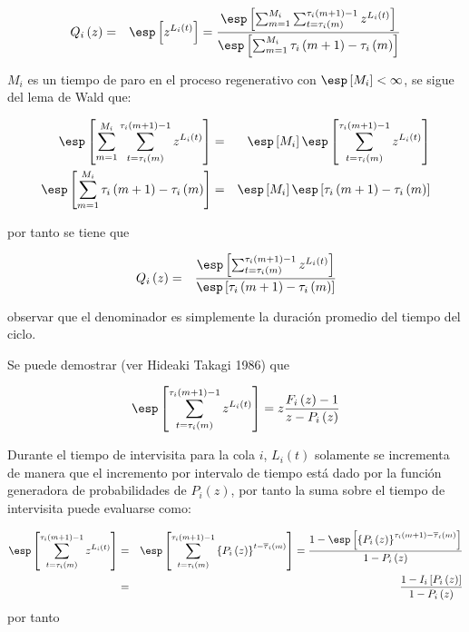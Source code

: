 \begin{eqnarray*}
Q_{i}\left(z\right)&=&\esp\left[z^{L_{i}\left(t\right)}\right]=\frac{\esp\left[\sum_{m=1}^{M_{i}}\sum_{t=\tau_{i}\left(m\right)}^{\tau_{i}\left(m+1\right)-1}z^{L_{i}\left(t\right)}\right]}{\esp\left[\sum_{m=1}^{M_{i}}\tau_{i}\left(m+1\right)-\tau_{i}\left(m\right)\right]}
\end{eqnarray*}

$M_{i}$ es un tiempo de paro en el proceso regenerativo con $\esp\left[M_{i}\right]<\infty$, se sigue del lema de Wald que:


\begin{eqnarray*}
\esp\left[\sum_{m=1}^{M_{i}}\sum_{t=\tau_{i}\left(m\right)}^{\tau_{i}\left(m+1\right)-1}z^{L_{i}\left(t\right)}\right]&=&\esp\left[M_{i}\right]\esp\left[\sum_{t=\tau_{i}\left(m\right)}^{\tau_{i}\left(m+1\right)-1}z^{L_{i}\left(t\right)}\right]\\
\esp\left[\sum_{m=1}^{M_{i}}\tau_{i}\left(m+1\right)-\tau_{i}\left(m\right)\right]&=&\esp\left[M_{i}\right]\esp\left[\tau_{i}\left(m+1\right)-\tau_{i}\left(m\right)\right]
\end{eqnarray*}

por tanto se tiene que


\begin{eqnarray*}
Q_{i}\left(z\right)&=&\frac{\esp\left[\sum_{t=\tau_{i}\left(m\right)}^{\tau_{i}\left(m+1\right)-1}z^{L_{i}\left(t\right)}\right]}{\esp\left[\tau_{i}\left(m+1\right)-\tau_{i}\left(m\right)\right]}
\end{eqnarray*}

observar que el denominador es simplemente la duraci\'on promedio del tiempo del ciclo.


Se puede demostrar (ver Hideaki Takagi 1986) que

\begin{eqnarray*}
\esp\left[\sum_{t=\tau_{i}\left(m\right)}^{\tau_{i}\left(m+1\right)-1}z^{L_{i}\left(t\right)}\right]=z\frac{F_{i}\left(z\right)-1}{z-P_{i}\left(z\right)}
\end{eqnarray*}

Durante el tiempo de intervisita para la cola $i$, $L_{i}\left(t\right)$ solamente se incrementa de manera que el incremento por intervalo de tiempo est\'a dado por la funci\'on generadora de probabilidades de $P_{i}\left(z\right)$, por tanto la suma sobre el tiempo de intervisita puede evaluarse como:

\begin{eqnarray*}
\esp\left[\sum_{t=\tau_{i}\left(m\right)}^{\tau_{i}\left(m+1\right)-1}z^{L_{i}\left(t\right)}\right]&=&\esp\left[\sum_{t=\tau_{i}\left(m\right)}^{\tau_{i}\left(m+1\right)-1}\left\{P_{i}\left(z\right)\right\}^{t-\overline{\tau}_{i}\left(m\right)}\right]=\frac{1-\esp\left[\left\{P_{i}\left(z\right)\right\}^{\tau_{i}\left(m+1\right)-\overline{\tau}_{i}\left(m\right)}\right]}{1-P_{i}\left(z\right)}\\
&=&\frac{1-I_{i}\left[P_{i}\left(z\right)\right]}{1-P_{i}\left(z\right)}
\end{eqnarray*}
por tanto

